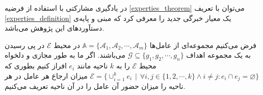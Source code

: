 در یادگیری مشارکتی با استفاده از فرضیه
\ref{experties_theorem}
می‌توان با تعریف
\ref{experties_definition}
یک معیار خبرگی جدید را معرفی کرد که مبنی و پایه‌ی دستآوردهای این پژوهش می‌باشد.

\begin{definition}\setstretch{\thebaselinestretch}\label{experties_definition}
فرض می‌کنیم مجموعه‌ای از عامل‌ها
$\mathbb{A} = \{\mathcal{A}_1, \mathcal{A}_2, \cdots, \mathcal{A}_m\}$
در محیط $\mathcal{E}$ در پی رسیدن به یک مجموعه اهداف
$\mathcal{G} \subseteq \{g_1, g_2, \cdots, g_n\}$
می‌باشند. اگر ما به طور مجازی و دلخواه محیط $\mathcal{E}$ را به $k$ ناحیه‌ مانند $e_i$ افراز کنیم بطوری که
$\mathcal{E} = \{\cup_{i=1}^{k} e_i\hspace{5pt}|\hspace{5pt}\forall i,j\in\{1,2,\cdots,k\} \land i \neq j : e_i \cap e_j = \varnothing\}$
میزان ارجاع هر عامل در هر ناحیه را میزان حضور آن عامل را در آن ناحیه تعریف می‌کنیم.
\end{definition}

